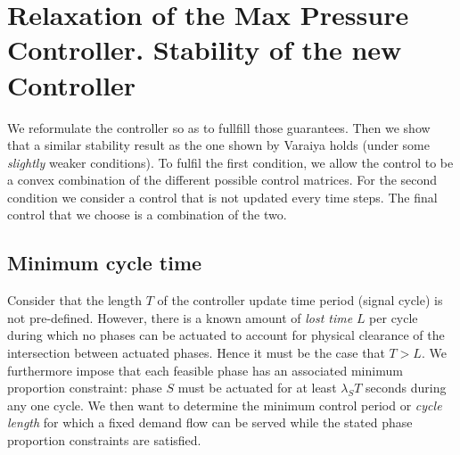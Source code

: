 \section{Relaxation of the Max Pressure Controller. Stability of the new Controller} \label{sec:immediatefeedback}




 



We reformulate the controller so as to fullfill those guarantees. 
Then we show that a similar stability result as the one shown by Varaiya holds (under some \emph{slightly} weaker conditions).
To fulfil the first condition, we allow the control to be a convex combination of the different possible control matrices.
For the second condition we consider a control that is not updated every time steps.
The final control that we choose is a combination of the two.







 

\subsection*{Minimum cycle time}
Consider that the length $T$ of the controller update time period (signal cycle) is not pre-defined. However, there is a known amount of \emph{lost time} $L$ per cycle during which no phases can be actuated to account for physical clearance of the intersection between actuated phases. Hence it must be the case that $T>L$.  We furthermore impose that each feasible phase has an associated minimum proportion constraint: phase $S$ must be actuated for at least $\lambda_S T$ seconds during any one cycle. We then want to determine the minimum control period or \emph{cycle length} for which a fixed demand flow can be served while the stated phase proportion constraints are satisfied. 

